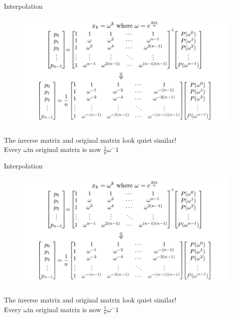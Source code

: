 \documentclass{beamer}
\begin{document}
\begin{frame}{Interpolation}
    
    \begin{figure}
        \centering
        \includegraphics[width=1\textwidth]{inversion.jpg}
        
        \label{fig:enter-label}
    \end{figure}
    The inverse matrix and original matrix look quiet similar!\\
    Every $\omega $in original matrix is now $\frac{1}{n} \omega^-1$
\end{frame}
\begin{frame}{Interpolation}
    
    \begin{figure}
        \centering
        \includegraphics[width=1\textwidth]{inversion.jpg}
        
        \label{fig:enter-label}
    \end{figure}
    The inverse matrix and original matrix look quiet similar!\\
    Every $\omega $in original matrix is now $\frac{1}{n} \omega^-1$
\end{frame}
\end{document}
